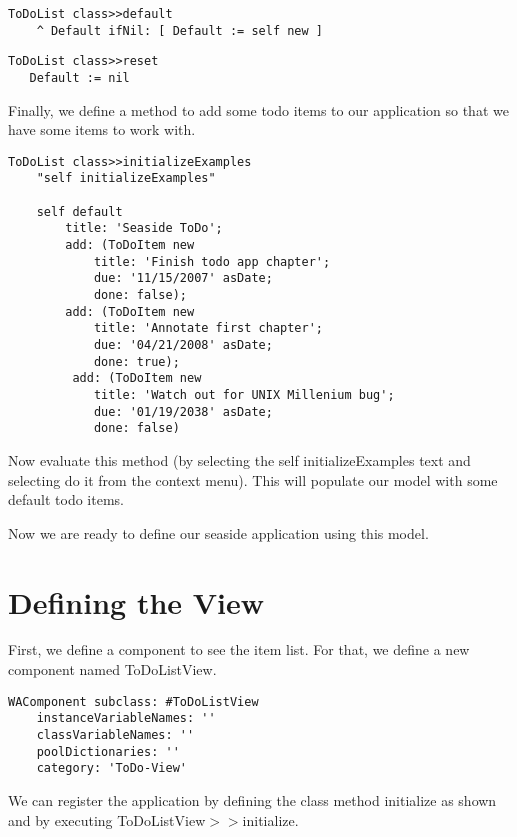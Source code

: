 \documentclass[a4paper,10pt,twoside]{book}
\newcommand{\ct}[1]{{\small\ttfamily\textup{#1}}}
\begin{document}
\begin{lstlisting}
ToDoList class>>default
    ^ Default ifNil: [ Default := self new ]
\end{lstlisting}

\begin{lstlisting}
ToDoList class>>reset
   Default := nil
\end{lstlisting}

Finally, we define a method to add some todo items to our application
so that we have some items to work with. 

\begin{lstlisting}
ToDoList class>>initializeExamples
    "self initializeExamples"

    self default
        title: 'Seaside ToDo';
        add: (ToDoItem new
            title: 'Finish todo app chapter';
            due: '11/15/2007' asDate;
            done: false);
        add: (ToDoItem new
            title: 'Annotate first chapter';
            due: '04/21/2008' asDate;
            done: true);
         add: (ToDoItem new
            title: 'Watch out for UNIX Millenium bug';
            due: '01/19/2038' asDate;
            done: false)
\end{lstlisting}

Now evaluate this method (by selecting the \ct{self initializeExamples} text and selecting \ct{do it} from the context menu). This will populate our model with some default todo items.

Now we are ready to define our seaside application using this model.

\section{Defining the View}
\label{book:inaction:todo:todoview}

First, we define a component to see the item list. For that, we define a new component named \ct{ToDoListView}.

\begin{lstlisting}
WAComponent subclass: #ToDoListView
    instanceVariableNames: ''
    classVariableNames: ''
    poolDictionaries: ''
    category: 'ToDo-View'
\end{lstlisting}

We can register the application by defining the class method \ct{initialize} as shown and by executing \ct{ToDoListView$>$$>$initialize}.
\end{document}
